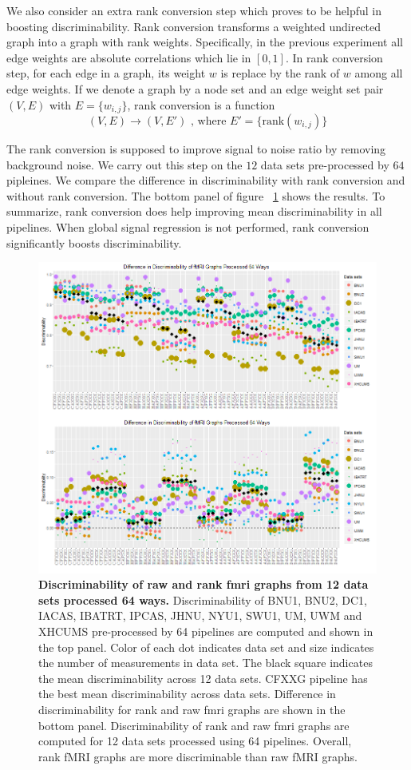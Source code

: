 \documentclass{article}
\begin{document}
We also consider an extra rank conversion step which proves to be helpful in boosting discriminability. Rank conversion transforms a weighted undirected graph into a graph with rank weights. Specifically, in the previous experiment all edge weights are absolute correlations which lie in $[0,1]$. In rank conversion step, for each edge in a graph, its weight $w$ is replace by the rank of $w$ among all edge weights. If we denote a graph by a node set and an edge weight set pair $(V,E)$ with $E=\{w_{i,j}\}$, rank conversion is a function
\[(V,E) \rightarrow (V,E') \text{ , where } E'= \{\text{rank}(w_{i,j})\} \]

The rank conversion is supposed to improve signal to noise ratio by removing background noise. We carry out this step on the $12$ data sets pre-processed by $64$ pipleines. We compare the difference in discriminability with rank conversion and without rank conversion. The bottom panel of figure ~\ref{fig:pipes} shows the results. To summarize, rank conversion does help improving mean discriminability in all pipelines. When global signal regression is not performed, rank conversion significantly boosts discriminability. 

\begin{figure}[ht!]
	\includegraphics[width=\linewidth]{../Figs/comb_mri.png}
	\caption{{\bf Discriminability of raw and rank fmri graphs from 12 data sets processed 64 ways.}  Discriminability of BNU1, BNU2, DC1, IACAS, IBATRT, IPCAS, JHNU, NYU1, SWU1, UM, UWM and XHCUMS pre-processed by 64 pipelines are computed and shown in the top panel. Color of each dot indicates data set and size indicates the number of measurements in data set. The black square indicates the mean discriminability across 12 data sets. CFXXG pipeline has the best mean discriminability across data sets. 
	Difference in discriminability for rank and raw fmri graphs are shown in the bottom panel. Discriminability of  rank and raw fmri graphs are computed for 12 data sets processed using 64 pipelines. Overall, rank fMRI graphs are more discriminable than raw fMRI graphs.}
	\label{fig:pipes}
\end{figure}
\end{document}
